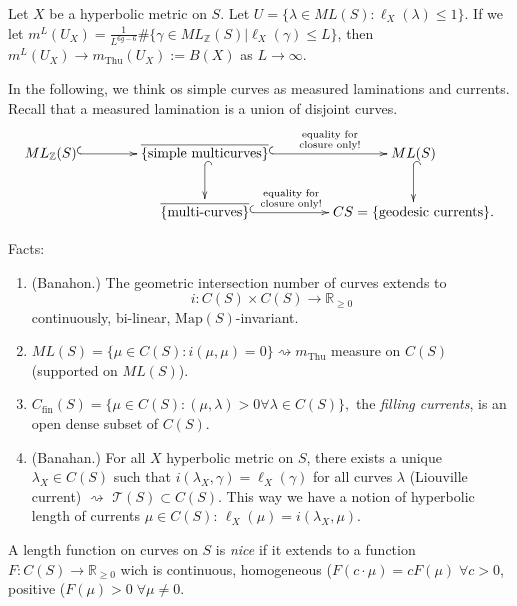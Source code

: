 Let $X$ be a hyperbolic metric on $S$.
Let $U=\{\lambda \in
ML(S):\ell_X(\lambda)\leq 1\}$.
If we let $m^L(U_X)=\frac{1}{L^{6g-6}}
\#\{\gamma \in
ML_{\mathbb{Z}}(S)|\ell_X(\gamma)\leq  L\}$,
then $m^L(U_X) \to m_{\text{Thu}}(U_X):=B(X)$
 as $L \to \infty$.

\medskip\noindent
In the following, we think os simple
curves as measured laminations and currents.
Recall that a measured lamination is
a union of disjoint curves.
$$
\xymatrix@C=4em{
ML_{\mathbb{Z}}(S)\ar@{^{(}->}[r]&\overline{
\{\text{simple
multicurves}\}}\ar@{^{(}->}[d]\ar@{^{(}->}[r]
^-{\substack{\text{equality for} \\
\text{closure only!}}}
&ML(S)\ar@{^{(}->}[d]\\
&\overline{\{\text{multi-curves}\}}\ar@{^{(}->}[r]^-{
\substack{\text{equality for} \\
\text{closure only!}}}
&CS=\{\text{geodesic currents}\}.
}
$$

\medskip\noindent
Facts:
\begin{enumerate}
\item (Banahon.) The geometric intersection
number of curves
extends to
$$
i:C(S) \times C(S) \to \mathbb{R}_{\geq 0}
$$
continuously, bi-linear,
$\text{Map}(S)$-invariant.

\item $ML(S)=\{\mu \in
C(S):i(\mu,\mu)=0\}\rightsquigarrow
m_{\text{Thu}}$ measure on $C(S)$
(supported on $ML(S)$).

\item $C_{\text{fin}}(S)=\{\mu \in C(S):
(\mu,\lambda)>0 \forall \lambda \in C(S)\},$
the {\it filling currents}, is an open dense
subset of $C(S)$.

\item (Banahan.) For all $X$ hyperbolic
metric on $S$,
there exists a unique $\lambda_X \in C(S)$
such that
$i(\lambda_X,\gamma)=\ell_X(\gamma)$ for all
curves $\lambda$
(Liouville current) $\rightsquigarrow $
$\mathcal{T}(S) \subset C(S)$.
This way we have a notion of hyperbolic
length of currents $\mu \in C(S)$:
$\ell_X(\mu)=i(\lambda_X,\mu)$.
\end{enumerate}

\begin{definition}
\label{definition-nice-length-function}
A length function on curves on $S$
is {\it nice} if it extends to a function
$F:C(S) \to \mathbb{R}_{\geq 0}$ wich is
continuous, homogeneous
($F(c\cdot\mu)=cF(\mu)\;\forall c>0$,
positive ($F(\mu)>0\;\forall \mu\neq 0$.
\end{definition}

